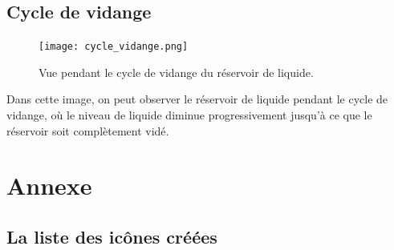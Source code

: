 \documentclass{article}
\begin{document}
\subsection{Cycle de vidange}

\begin{figure}[H]
    \centering
    \texttt{[image: cycle\_vidange.png]}

    \caption{Vue pendant le cycle de vidange du réservoir de liquide.}
    \label{fig:cycle_vidange}
\end{figure}

Dans cette image, on peut observer le réservoir de liquide pendant le cycle de vidange, où le niveau de liquide diminue progressivement jusqu'à ce que le réservoir soit complètement vidé.
\clearpage
\section{Annexe}

\subsection{La liste des icônes créées}
\end{document}
